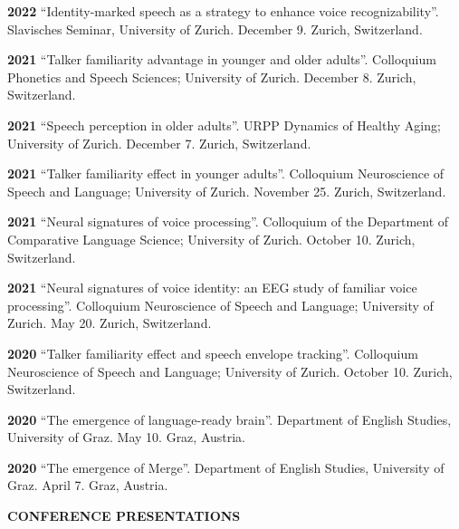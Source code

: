\documentclass[11pt]{article}
\newcommand{\hangpara}{
 \setlength{\parindent}{0in} %
 \hangindent=0.42in %
}
\begin{document}
\vskip 6pt
\hangpara
{\bf 2022}\hspace{1ex} “Identity-marked speech as a strategy to enhance voice recognizability”. Slavisches Seminar, University of Zurich. December 9. Zurich, Switzerland.

\vskip 6pt
\hangpara
{\bf 2021}\hspace{1ex} “Talker familiarity advantage in younger and older adults”. Colloquium Phonetics and Speech Sciences; University of Zurich. December 8. Zurich, Switzerland.

\vskip 6pt
\hangpara
{\bf 2021}\hspace{1ex} “Speech perception in older adults”. URPP Dynamics of Healthy Aging; University of Zurich. December 7. Zurich, Switzerland.

\vskip 6pt
\hangpara
{\bf 2021}\hspace{1ex} “Talker familiarity effect in younger adults”. Colloquium Neuroscience of Speech and Language; University of Zurich. November 25. Zurich, Switzerland.

\vskip 6pt
\hangpara
{\bf 2021}\hspace{1ex} “Neural signatures of voice processing”. Colloquium of the Department of Comparative Language Science; University of Zurich. October 10. Zurich, Switzerland.

\vskip 6pt
\hangpara
{\bf 2021}\hspace{1ex} “Neural signatures of voice identity: an EEG study of familiar voice processing”. Colloquium Neuroscience of Speech and Language; University of Zurich. May 20. Zurich, Switzerland.

\vskip 6pt
\hangpara
{\bf 2020}\hspace{1ex} “Talker familiarity effect and speech envelope tracking”. Colloquium Neuroscience of Speech and Language; University of Zurich. October 10. Zurich, Switzerland.

\vskip 6pt
\hangpara
{\bf 2020}\hspace{1ex} “The emergence of language-ready brain”. Department of English Studies, University of Graz. May 10. Graz, Austria.

\vskip 6pt
\hangpara
{\bf 2020}\hspace{1ex} “The emergence of Merge”. Department of English Studies, University of Graz. April 7. Graz, Austria.





\vskip 20pt
\begin{flushleft}
{\bf CONFERENCE PRESENTATIONS}
\end{flushleft}
\end{document}
